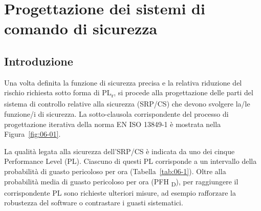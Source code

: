 \chapter{Progettazione dei sistemi di comando di sicurezza}
\label{cap:06}

\section{Introduzione}
\label{sec:06-1}
Una volta definita la funzione di sicurezza precisa e la relativa riduzione del rischio richiesta sotto forma di PL\textsubscript{r}, si procede alla progettazione delle parti del sistema di controllo relative alla sicurezza (SRP/CS) che devono svolgere la/le funzione/i di sicurezza. La sotto-clausola corrispondente del processo di progettazione iterativa della norma EN ISO 13849-1 è mostrata nella Figura~\ref{fig:06-01}.

La qualità legata alla sicurezza dell'SRP/CS è indicata da uno dei cinque Performance Level (PL). Ciascuno di questi PL corrisponde a un intervallo della probabilità di guasto pericoloso per ora (Tabella~\ref{tab:06-1}). Oltre alla probabilità media di guasto pericoloso per ora (PFH \textsubscript{D}), per raggiungere il corrispondente PL sono richieste ulteriori misure, ad esempio rafforzare la robustezza del software o contrastare i guasti sistematici.

\begin{center}
    \begin{minipage}{\textwidth}
        \centering
        \captionsetup{hypcap=false}
        \resizebox{0.92\textwidth}{!}{}
        \label{fig:06-01}
    \end{minipage}
\end{center}

